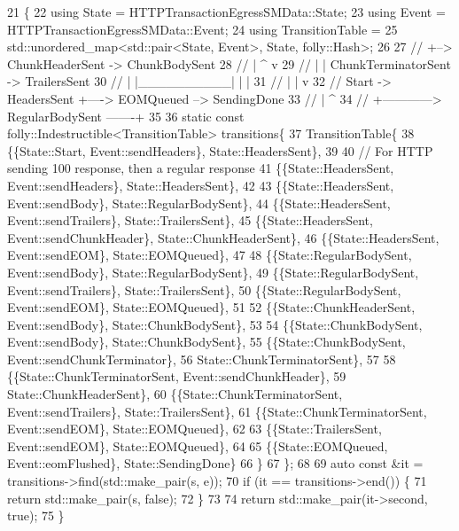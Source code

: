 \begin{DoxyCode}
21                                                                       \{
22   \textcolor{keyword}{using} State = HTTPTransactionEgressSMData::State;
23   \textcolor{keyword}{using} Event = HTTPTransactionEgressSMData::Event;
24   \textcolor{keyword}{using} TransitionTable =
25       std::unordered\_map<std::pair<State, Event>, State, folly::Hash>;
26 
27   \textcolor{comment}{//             +--> ChunkHeaderSent -> ChunkBodySent}
28   \textcolor{comment}{//             |      ^                    v}
29   \textcolor{comment}{//             |      |   ChunkTerminatorSent -> TrailersSent}
30   \textcolor{comment}{//             |      |\_\_\_\_\_\_\_\_\_\_|        |          |}
31   \textcolor{comment}{//             |                          |          v}
32   \textcolor{comment}{// Start -> HeadersSent                   +----> EOMQueued --> SendingDone}
33   \textcolor{comment}{//             |                                     ^}
34   \textcolor{comment}{//             +------------> RegularBodySent -------+}
35 
36   \textcolor{keyword}{static} \textcolor{keyword}{const} folly::Indestructible<TransitionTable> transitions\{
37     TransitionTable\{
38       \{\{State::Start, Event::sendHeaders\}, State::HeadersSent\},
39 
40       \textcolor{comment}{// For HTTP sending 100 response, then a regular response}
41       \{\{State::HeadersSent, Event::sendHeaders\}, State::HeadersSent\},
42 
43       \{\{State::HeadersSent, Event::sendBody\}, State::RegularBodySent\},
44       \{\{State::HeadersSent, Event::sendTrailers\}, State::TrailersSent\},
45       \{\{State::HeadersSent, Event::sendChunkHeader\}, State::ChunkHeaderSent\},
46       \{\{State::HeadersSent, Event::sendEOM\}, State::EOMQueued\},
47 
48       \{\{State::RegularBodySent, Event::sendBody\}, State::RegularBodySent\},
49       \{\{State::RegularBodySent, Event::sendTrailers\}, State::TrailersSent\},
50       \{\{State::RegularBodySent, Event::sendEOM\}, State::EOMQueued\},
51 
52       \{\{State::ChunkHeaderSent, Event::sendBody\}, State::ChunkBodySent\},
53 
54       \{\{State::ChunkBodySent, Event::sendBody\}, State::ChunkBodySent\},
55       \{\{State::ChunkBodySent, Event::sendChunkTerminator\},
56        State::ChunkTerminatorSent\},
57 
58       \{\{State::ChunkTerminatorSent, Event::sendChunkHeader\},
59        State::ChunkHeaderSent\},
60       \{\{State::ChunkTerminatorSent, Event::sendTrailers\}, State::TrailersSent\},
61       \{\{State::ChunkTerminatorSent, Event::sendEOM\}, State::EOMQueued\},
62 
63       \{\{State::TrailersSent, Event::sendEOM\}, State::EOMQueued\},
64 
65       \{\{State::EOMQueued, Event::eomFlushed\}, State::SendingDone\}
66     \}
67   \};
68 
69   \textcolor{keyword}{auto} \textcolor{keyword}{const} &it = transitions->find(std::make\_pair(s, e));
70   \textcolor{keywordflow}{if} (it == transitions->end()) \{
71     \textcolor{keywordflow}{return} std::make\_pair(s, \textcolor{keyword}{false});
72   \}
73 
74   \textcolor{keywordflow}{return} std::make\_pair(it->second, \textcolor{keyword}{true});
75 \}
\end{DoxyCode}
